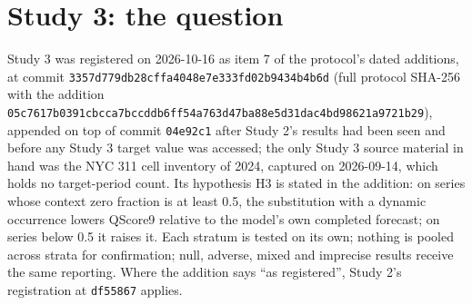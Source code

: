 \providecommand{\qs}{QScore9}
\providecommand{\hc}{\texttt{hurdle\_count\_28}}

\section{Study 3: the question}
\label{sec:s3question}

Study 3 was registered on 2026-10-16 as item 7 of the protocol's dated additions, at commit
\texttt{3357d779db28cffa4048e7e333fd02b9434b4b6d} (full protocol SHA-256 with the addition
\texttt{05c7617b0391cbcca7bccddb6ff54a763d47ba88e5d31dac4bd98621a9721b29}), appended on top of commit
\texttt{04e92c1} after Study 2's results had been seen and before any Study 3 target value was accessed;
the only Study 3 source material in hand was the NYC 311 cell inventory of 2024, captured on 2026-09-14,
which holds no target-period count. Its hypothesis H3 is stated in the addition: on series whose context
zero fraction is at least 0.5, the substitution with a dynamic occurrence lowers \qs{} relative to the
model's own completed forecast; on series below 0.5 it raises it. Each stratum is tested on its own;
nothing is pooled across strata for confirmation; null, adverse, mixed and imprecise results receive the
same reporting. Where the addition says ``as registered'', Study 2's registration at \texttt{df55867}
applies.

